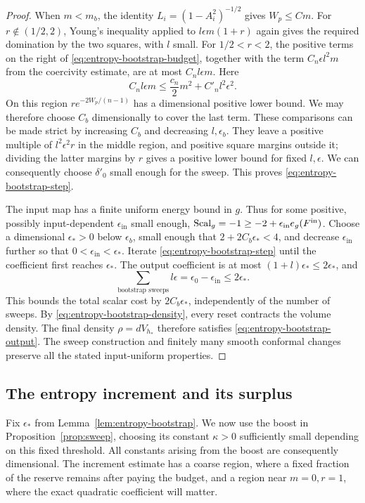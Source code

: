 \begin{proof}
When \(m<m_b\), the identity
\(L_i=(1-A_i^2)^{-1/2}\) gives \(W_p\leq C m\).
For \(r\notin(1/2,2)\), Young's inequality applied to
\(l\epsilon m(1+r)\) again gives the required domination by the two
squares, with \(l\) small.  For \(1/2<r<2\), the positive terms on the
right of \eqref{eq:entropy-bootstrap-budget}, together with the term
\(C_n\epsilon l^2m\) from the coercivity estimate, are at most
\(C_nl\epsilon m\).  Here
\[
 C_nl\epsilon m\leq \frac{c_n}{2}m^2+C'_n l^2\epsilon^2.
\]
On this region \(r e^{-2W_p/(n-1)}\) has a dimensional positive lower
bound.  We may therefore choose \(C_b\) dimensionally to cover the
last term.  These comparisons can be made strict by increasing \(C_b\)
and decreasing \(l,\epsilon_b\).  They leave a positive multiple of
\(l^2\epsilon^2r\) in the middle region, and positive square margins
outside it; dividing the latter margins by \(r\) gives a positive
lower bound for fixed \(l,\epsilon\).  We can consequently choose
\(\delta'_0\) small enough for the sweep.  This proves
\eqref{eq:entropy-bootstrap-step}.

The input map has a finite uniform energy bound in \(g\).  Thus for
some positive, possibly input-dependent \(\epsilon_{\mathrm{in}}\)
small enough,
\(\operatorname{Scal}_g=-1\geq-2+\epsilon_{\mathrm{in}}e_g(F^{\mathrm{in}})\).
Choose a dimensional \(\epsilon_*>0\) below \(\epsilon_b\), small
enough that \(2+2C_b\epsilon_*<4\), and decrease
\(\epsilon_{\mathrm{in}}\) further so that
\(0<\epsilon_{\mathrm{in}}<\epsilon_*\).  Iterate
\eqref{eq:entropy-bootstrap-step} until the coefficient first reaches
\(\epsilon_*\).  The output coefficient is at most
\((1+l)\epsilon_*\leq2\epsilon_*\), and
\[
 \sum_{\text{bootstrap sweeps}}l\epsilon
 =\epsilon_0-\epsilon_{\mathrm{in}}\leq2\epsilon_*.
\]
This bounds the total scalar cost by \(2C_b\epsilon_*\), independently
of the number of sweeps.  By \eqref{eq:entropy-bootstrap-density},
every reset contracts the volume density.  The final density
\(\rho=dV_{h_*}\) therefore satisfies
\eqref{eq:entropy-bootstrap-output}.  The sweep construction and
finitely many smooth conformal changes preserve all the stated
input-uniform properties.
\end{proof}

\subsection{The entropy increment and its surplus}

Fix \(\epsilon_*\) from Lemma~\ref{lem:entropy-bootstrap}.  We now use
the boost in Proposition~\ref{prop:sweep}, choosing its constant
\(\kappa>0\) sufficiently small depending on this fixed threshold.
All constants arising from the boost are consequently dimensional.
The increment estimate has a coarse region, where a fixed fraction of
the reserve remains after paying the budget, and a region near
\(m=0,r=1\), where the exact quadratic coefficient will matter.

